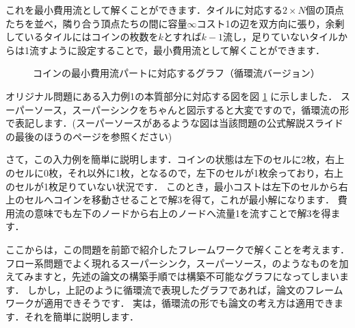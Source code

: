 \documentclass[13pt]{jarticle}
\begin{document}
これを最小費用流として解くことができます．タイルに対応する$2 \times N$個の頂点たちを並べ，隣り合う頂点たちの間に容量$\infty$コスト1の辺を双方向に張り，余剰しているタイルにはコインの枚数を$k$とすれば$k-1$流し，足りていないタイルからは1流すように設定することで，最小費用流として解くことができます．


\begin{figure}[htbp]
\centering
{}

\caption{コインの最小費用流パートに対応するグラフ（循環流バージョン）}
\label{hogehoge}
\end{figure}

オリジナル問題にある入力例1の本質部分に対応する図を図 \ref{hogehoge} に示しました．
スーパーソース，スーパーシンクをちゃんと図示すると大変ですので，循環流の形で表記します．(スーパーソースがあるような図は当該問題の公式解説スライドの最後のほうのページを参照ください)

さて，この入力例を簡単に説明します．コインの状態は左下のセルに2枚，右上のセルに0枚，それ以外に1枚，となるので，左下のセルが1枚余っており，右上のセルが1枚足りていない状況です．
このとき，最小コストは左下のセルから右上のセルへコインを移動させることで解3を得て，これが最小解になります．
費用流の意味でも左下のノードから右上のノードへ流量1を流すことで解3を得ます．


ここからは，この問題を前節で紹介したフレームワークで解くことを考えます．
フロー系問題でよく現れるスーパーシンク，スーパーソース，のようなものを加えてみますと，先述の論文の構築手順では構築不可能なグラフになってしまいます．
しかし，上記のように循環流で表現したグラフであれば，論文のフレームワークが適用できそうです．
実は，循環流の形でも論文の考え方は適用できます．それを簡単に説明します．
\end{document}
